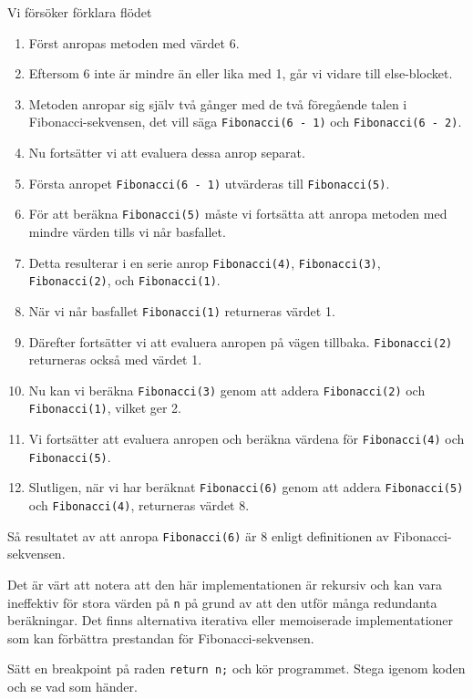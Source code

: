 Vi försöker förklara flödet

\begin{enumerate}
\def\labelenumi{\arabic{enumi}.}
\tightlist
\item
  Först anropas metoden med värdet 6.
\item
  Eftersom 6 inte är mindre än eller lika med 1, går vi vidare till
  else-blocket.
\item
  Metoden anropar sig själv två gånger med de två föregående talen i
  Fibonacci-sekvensen, det vill säga \texttt{Fibonacci(6\ -\ 1)} och
  \texttt{Fibonacci(6\ -\ 2)}.
\item
  Nu fortsätter vi att evaluera dessa anrop separat.
\item
  Första anropet \texttt{Fibonacci(6\ -\ 1)} utvärderas till
  \texttt{Fibonacci(5)}.
\item
  För att beräkna \texttt{Fibonacci(5)} måste vi fortsätta att anropa
  metoden med mindre värden tills vi når basfallet.
\item
  Detta resulterar i en serie anrop \texttt{Fibonacci(4)},
  \texttt{Fibonacci(3)}, \texttt{Fibonacci(2)}, och
  \texttt{Fibonacci(1)}.
\item
  När vi når basfallet \texttt{Fibonacci(1)} returneras värdet 1.
\item
  Därefter fortsätter vi att evaluera anropen på vägen tillbaka.
  \texttt{Fibonacci(2)} returneras också med värdet 1.
\item
  Nu kan vi beräkna \texttt{Fibonacci(3)} genom att addera
  \texttt{Fibonacci(2)} och \texttt{Fibonacci(1)}, vilket ger 2.
\item
  Vi fortsätter att evaluera anropen och beräkna värdena för
  \texttt{Fibonacci(4)} och \texttt{Fibonacci(5)}.
\item
  Slutligen, när vi har beräknat \texttt{Fibonacci(6)} genom att addera
  \texttt{Fibonacci(5)} och \texttt{Fibonacci(4)}, returneras värdet 8.
\end{enumerate}

Så resultatet av att anropa \texttt{Fibonacci(6)} är 8 enligt
definitionen av Fibonacci-sekvensen.

Det är värt att notera att den här implementationen är rekursiv och kan
vara ineffektiv för stora värden på \texttt{n} på grund av att den utför
många redundanta beräkningar. Det finns alternativa iterativa eller
memoiserade implementationer som kan förbättra prestandan för
Fibonacci-sekvensen.

Sätt en breakpoint på raden \texttt{return\ n;} och kör programmet.
Stega igenom koden och se vad som händer.

